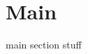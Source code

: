 \documentclass[11pt,a4paper]{article}
\begin{document}
\section{Main}
main section stuff


\end{document}
